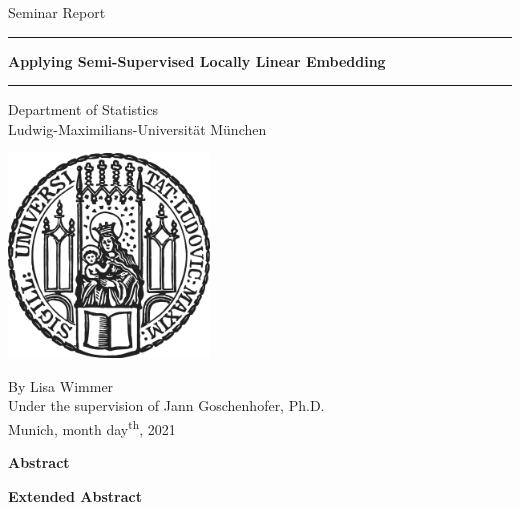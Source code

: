 \documentclass[12pt]{article}
\begin{document}


 
\begin{titlepage}
\begin{center}
    
\LARGE
Seminar Report
    
\vspace{0.5cm}
      
\rule{\textwidth}{1.5pt}
\LARGE 
\textbf{Applying Semi-Supervised Locally Linear Embedding}
\rule{\textwidth}{1.5pt}
   
\vspace{0.5cm}
      
\large
Department of Statistics \\
Ludwig-Maximilians-Universität München
      
\vspace{3.5cm}

\includegraphics[width = 0.4\textwidth]{figures/sigillum.png}

\vspace{3.5cm}

\large
By Lisa Wimmer \\
Under the supervision of Jann Goschenhofer, Ph.D. \\
Munich, month day\textsuperscript{th}, 2021

\end{center}
\end{titlepage}


\newpage

\Large
\noindent
\textbf{Abstract}
\vspace{0.5cm} \\
\noindent
\normalsize

\newpage

\Large
\noindent
\textbf{Extended Abstract}
\vspace{0.5cm} \\
\noindent
\normalsize

\newpage
\end{document}
